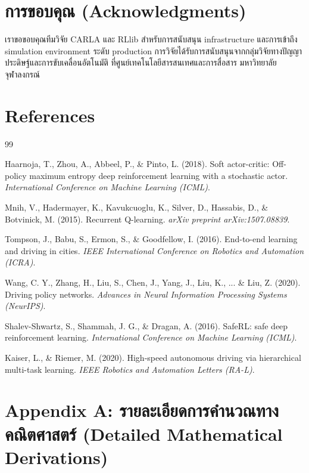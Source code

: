 \documentclass[10pt,a4paper,twocolumn]{article}
\begin{document}
\section*{การขอบคุณ (Acknowledgments)}

เราขอขอบคุณทีมวิจัย CARLA และ RLlib สำหรับการสนับสนุน infrastructure และการเข้าถึง simulation environment ระดับ production การวิจัยได้รับการสนับสนุนจากกลุ่มวิจัยทางปัญญาประดิษฐ์และการขับเคลื่อนอัตโนมัติ ที่ศูนย์เทคโนโลยีสารสนเทศและการสื่อสาร มหาวิทยาลัยจุฬาลงกรณ์

\section*{References}

\begin{thebibliography}{99}

Haarnoja, T., Zhou, A., Abbeel, P., \& Pinto, L. (2018). Soft actor-critic: Off-policy maximum entropy deep reinforcement learning with a stochastic actor. \textit{International Conference on Machine Learning (ICML)}.

Mnih, V., Hadermayer, K., Kavukcuoglu, K., Silver, D., Hassabis, D., & Botvinick, M. (2015). Recurrent Q-learning. \textit{arXiv preprint arXiv:1507.08839}.

Tompson, J., Babu, S., Ermon, S., \& Goodfellow, I. (2016). End-to-end learning and driving in cities. \textit{IEEE International Conference on Robotics and Automation (ICRA)}.

Wang, C. Y., Zhang, H., Liu, S., Chen, J., Yang, J., Liu, K., ... \& Liu, Z. (2020). Driving policy networks. \textit{Advances in Neural Information Processing Systems (NeurIPS)}.

Shalev-Shwartz, S., Shammah, J. G., \& Dragan, A. (2016). SafeRL: safe deep reinforcement learning. \textit{International Conference on Machine Learning (ICML)}.

Kaiser, L., \& Riemer, M. (2020). High-speed autonomous driving via hierarchical multi-task learning. \textit{IEEE Robotics and Automation Letters (RA-L)}.

\end{thebibliography}

\section*{Appendix A: รายละเอียดการคำนวณทางคณิตศาสตร์ (Detailed Mathematical Derivations)}
\end{document}
